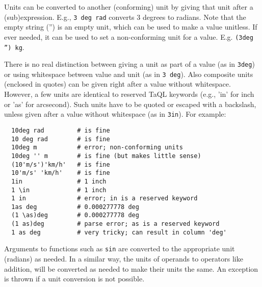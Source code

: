 Units can be converted to another (conforming) unit by giving that
unit after a (sub)expression. E.g., \texttt{3 deg rad} converts 3 degrees to radians. 
Note that the empty string ('') is an empty unit, which can be used to
make a value unitless. If ever needed, it can be used to set a
non-conforming unit for a value. E.g. \texttt{(3deg '') kg}.

There is no real distinction between giving a unit as part of a value
(as in \texttt{3deg}) or using whitespace between value and unit (as in
\texttt{3 deg}). Also composite units (enclosed in quotes) can be
given right after a value without whitespace.
\\However, a few units are identical to reserved TaQL keywords (e.g., 'in' for
inch or 'as' for arcsecond). Such units have to be quoted or escaped
with a backslash, unless given after a value without whitespace (as in
\texttt{3in}).
For example:
\begin{verbatim}
  10deg rad         # is fine
  10 deg rad        # is fine
  10deg m           # error; non-conforming units
  10deg '' m        # is fine (but makes little sense)
  (10'm/s')'km/h'   # is fine       
  10'm/s' 'km/h'    # is fine
  1in               # 1 inch
  1 \in             # 1 inch
  1 in              # error; in is a reserved keyword
  1as deg           # 0.000277778 deg
  (1 \as)deg        # 0.000277778 deg
  (1 as)deg         # parse error; as is a reserved keyword
  1 as deg          # very tricky; can result in column 'deg'
\end{verbatim}

Arguments to functions such as \texttt{sin} are converted to the
appropriate unit (radians) as needed. In a similar way, the units of
operands to operators like addition, will be converted as needed to
make their units the same.
An exception is thrown if a unit conversion is not possible.


